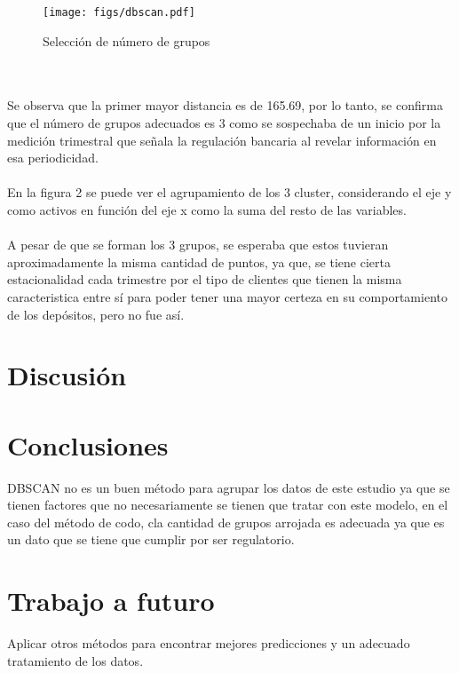 \documentclass{article}
\begin{document}
\begin{figure}
    \centering
    \texttt{[image: figs/dbscan.pdf]}
    \caption{Selección de número de grupos}
    \label{fig:Método de codo}
\end{figure}

\\
\\

Se observa que la primer mayor distancia es de 165.69, por lo tanto, se confirma que el número de grupos adecuados es 3 como se sospechaba de un inicio por la medición trimestral que señala la regulación bancaria al revelar información en esa periodicidad.
\\
\\
En la figura 2 se puede ver el agrupamiento de los 3 cluster, considerando el eje y como activos en función del eje x como la suma del resto de las variables.
\\
\\
A pesar de que se forman los 3 grupos, se esperaba que estos tuvieran aproximadamente la misma cantidad de puntos, ya que, se tiene cierta estacionalidad cada trimestre por el tipo de clientes que tienen la misma caracteristica entre sí para poder tener una mayor certeza en su comportamiento de los depósitos, pero no fue así.

\section{Discusión}


\section{Conclusiones}
DBSCAN no es un buen método para agrupar los datos de este estudio ya que se tienen factores que no necesariamente se tienen que tratar con este modelo, en el caso del método de codo, cla cantidad de grupos arrojada es adecuada ya que es un dato que se tiene que cumplir por ser regulatorio.

\section{Trabajo a futuro}
Aplicar otros métodos para encontrar mejores predicciones y un adecuado tratamiento de los datos.



\end{document}
